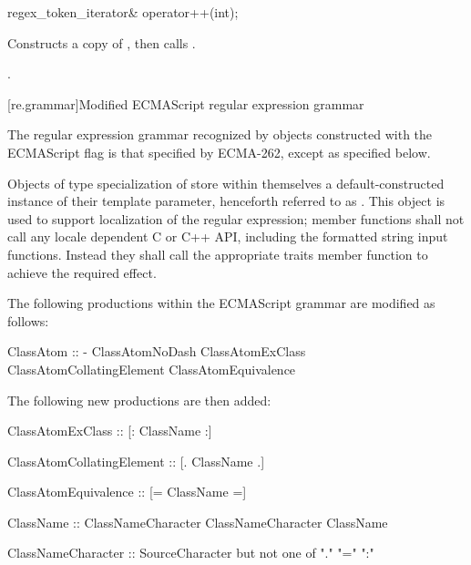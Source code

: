 %
%
\begin{itemdecl}
regex_token_iterator& operator++(int); 
\end{itemdecl}

\begin{itemdescr}
\pnum\effects  Constructs a copy  of , then calls .

\pnum\returns  {}.
\end{itemdescr}

[re.grammar]{Modified ECMAScript regular expression grammar}
%
%

\pnum
{}%
%
The regular expression grammar recognized by 
 objects constructed with the ECMAScript 
flag is that specified by ECMA-262, except as specified below.

\pnum
{}%
%
Objects of type specialization of  store within themselves a
default-constructed instance of their  template parameter, henceforth
referred to as . This  object is used to support localization
of the regular expression;  member functions shall not call
any locale dependent C or C++ API, including the formatted string input functions.
Instead they shall call the appropriate traits member function to achieve the required effect.

\pnum
The following productions within the ECMAScript grammar are modified as follows:

\begin{codeblock}
ClassAtom ::
  -
  ClassAtomNoDash
  ClassAtomExClass
  ClassAtomCollatingElement
  ClassAtomEquivalence
\end{codeblock}

\pnum
The following new productions are then added:

\begin{codeblock}
ClassAtomExClass ::
  [: ClassName :]

ClassAtomCollatingElement ::
  [. ClassName .]

ClassAtomEquivalence ::
  [= ClassName =]

ClassName ::
  ClassNameCharacter
  ClassNameCharacter ClassName

ClassNameCharacter ::
  SourceCharacter but not one of "." "=" ":"
\end{codeblock}

